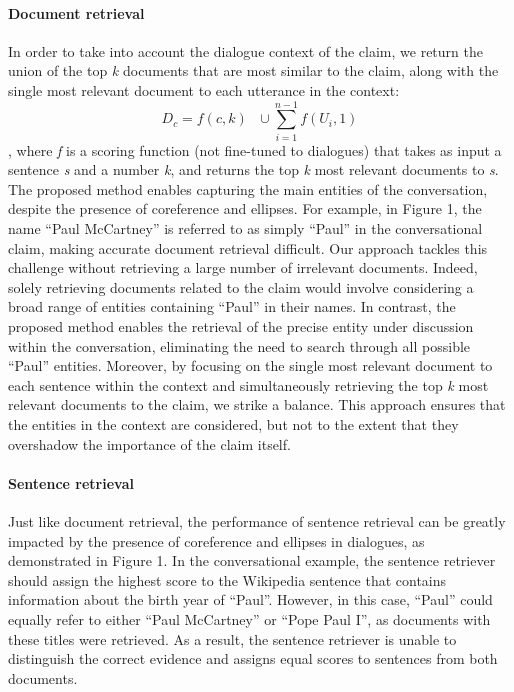 \paragraph{Document retrieval}
In order to take into account the dialogue context of the claim,
we return the union of the top \textit{k} documents that are most similar to the claim, along with the single most relevant document to each utterance in the context:
\begin{equation}
    D_c = f(c,k)\text{ } \cup \sum_{i = 1}^{n-1} f(U_i,1) 
\end{equation},
where \textit{f} is a scoring function (not fine-tuned to dialogues) that takes as input a sentence \textit{s} and a number \textit{k}, and returns the top \textit{k} most relevant %
documents to \textit{s}.
%
The proposed method enables capturing the main entities of the conversation, despite the presence of coreference and ellipses. For example, in Figure 1, the name ``Paul McCartney'' is referred to as simply ``Paul'' in the conversational claim, making accurate document retrieval difficult.  Our approach tackles this challenge without retrieving a large number of irrelevant documents. Indeed, solely retrieving documents related to the claim would involve considering a broad range of entities containing ``Paul'' in their names. In contrast, the proposed method enables the retrieval of the precise entity under discussion within the conversation, eliminating the need to search through all possible ``Paul'' entities. Moreover, by focusing on the single most relevant document to each sentence within the context and simultaneously retrieving the top \textit{k} most relevant documents to the claim, we strike a balance. This approach ensures that the entities in the context are considered, but not to the extent that they overshadow the importance of the claim itself.

\paragraph{Sentence retrieval}
Just like document retrieval, the performance of sentence retrieval can be greatly impacted by the presence of coreference and ellipses in dialogues, as demonstrated in Figure 1. In the conversational example, the sentence retriever should %
assign the highest score to the Wikipedia sentence that contains information about the birth year of ``Paul''. However, in this case, ``Paul'' could equally refer to either ``Paul McCartney'' or ``Pope Paul I'', as documents with these titles were retrieved. As a result, the sentence retriever
is unable to distinguish the correct evidence and assigns equal scores to sentences from both documents.

